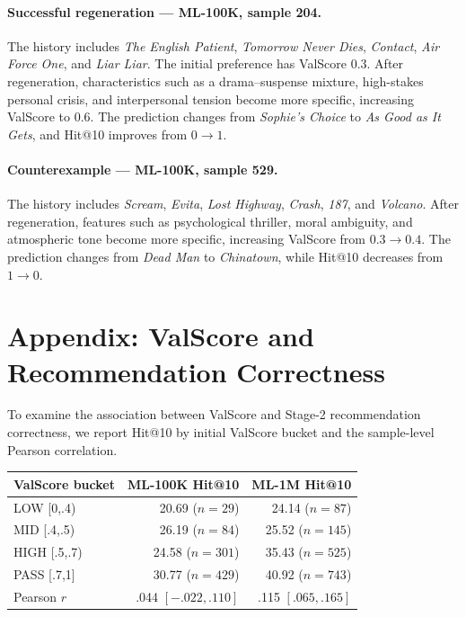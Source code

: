 \documentclass[11pt]{article}
\begin{document}
\paragraph{Successful regeneration --- ML-100K, sample 204.}
The history includes \emph{The English Patient}, \emph{Tomorrow Never Dies}, \emph{Contact}, \emph{Air Force One}, and \emph{Liar Liar}. The initial preference has ValScore 0.3. After regeneration, characteristics such as a drama--suspense mixture, high-stakes personal crisis, and interpersonal tension become more specific, increasing ValScore to 0.6. The prediction changes from \emph{Sophie's Choice} to \emph{As Good as It Gets}, and Hit@10 improves from $0\rightarrow1$.

\paragraph{Counterexample --- ML-100K, sample 529.}
The history includes \emph{Scream}, \emph{Evita}, \emph{Lost Highway}, \emph{Crash}, \emph{187}, and \emph{Volcano}. After regeneration, features such as psychological thriller, moral ambiguity, and atmospheric tone become more specific, increasing ValScore from $0.3\rightarrow0.4$. The prediction changes from \emph{Dead Man} to \emph{Chinatown}, while Hit@10 decreases from $1\rightarrow0$.

\section{Appendix: ValScore and Recommendation Correctness}
\label{app:valscore_assoc}

To examine the association between ValScore and Stage-2 recommendation correctness, we report Hit@10 by initial ValScore bucket and the sample-level Pearson correlation.

\begin{table}[h]
\centering
\small
\setlength{\tabcolsep}{4pt}
\begin{tabular}{lrr}
\toprule
\textbf{ValScore bucket} & \textbf{ML-100K Hit@10} & \textbf{ML-1M Hit@10} \\
\midrule
LOW [0,.4)   & 20.69 ($n=29$)  & 24.14 ($n=87$) \\
MID [.4,.5)  & 26.19 ($n=84$)  & 25.52 ($n=145$) \\
HIGH [.5,.7) & 24.58 ($n=301$) & 35.43 ($n=525$) \\
PASS [.7,1]  & 30.77 ($n=429$) & 40.92 ($n=743$) \\
Pearson $r$ & .044 $[-.022,.110]$ & .115 $[.065,.165]$ \\
\bottomrule
\end{tabular}
\end{table}
\end{document}
